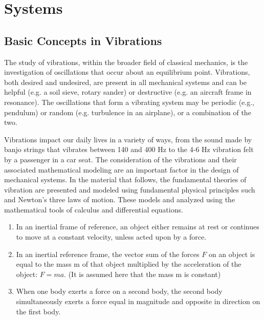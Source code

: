\documentclass[12pt,letter]{article}
\begin{document}
	
	\setcounter{section}{1}	


\section{Systems}

	\subsection{Basic Concepts in Vibrations}

    The study of vibrations, within the broader field of classical mechanics, is the investigation of oscillations that occur about an equilibrium point. Vibrations, both desired and undesired, are present in all mechanical systems and can be helpful (e.g. a soil sieve, rotary sander) or destructive (e.g. an aircraft frame in resonance). The oscillations that form a vibrating system may be periodic (e.g., pendulum) or random (e.g. turbulence in an airplane), or a combination of the two. 

    Vibrations impact our daily lives in a variety of ways, from the sound made by banjo strings that vibrates between 140 and 400 Hz to the 4-6 Hz vibration felt by a passenger in a car seat. The consideration of the vibrations and their associated mathematical modeling are an important factor in the design of mechanical systems. In the material that follows, the fundamental theories of vibration are presented and modeled using fundamental physical principles such and Newton's three laws of motion. These models and analyzed using the mathematical tools of calculus and differential equations. 

	\begin{review}
		\begin{enumerate}
			\item In an inertial frame of reference, an object either remains at rest or continues to move at a constant velocity, unless acted upon by a force.
			\item In an inertial reference frame, the vector sum of the forces $F$ on an object is equal to the mass m of that object multiplied by the acceleration of the object: $F = ma$. (It is assumed here that the mass m is constant)
			\item When one body exerts a force on a second body, the second body simultaneously exerts a force equal in magnitude and opposite in direction on the first body.
		\end{enumerate}
	\end{review}
\end{document}
